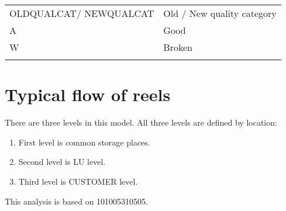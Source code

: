 \documentclass[a4paper]{report}
\begin{document}
\begin{table}[h]
\begin{tabular}{| p{4cm} | p{10cm} |}
	OLDQUALCAT/ NEWQUALCAT & Old / New quality category \\
	A & Good \\
	W & Broken \\
	  & \\
\end{tabular}
\end{table}

\newpage
\section{Typical flow of reels}
There are three levels in this model. All three levels are defined by location:
\begin{enumerate}
	\item
	First level is common storage places.
	\item
	Second level is LU level.
	\item
	Third level is CUSTOMER level.
\end{enumerate}
This analysis is based on 101005310505.
\end{document}
